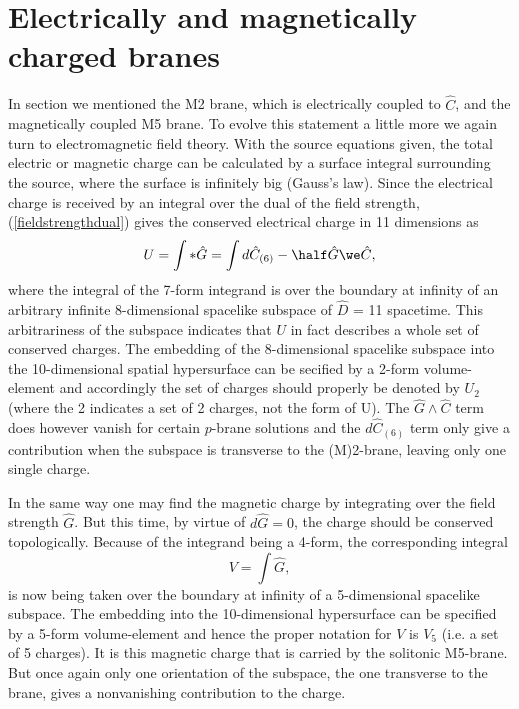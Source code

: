 \section{Electrically and magnetically charged branes}
In section  we mentioned the M2 brane, which is electrically coupled to $\hat C$, and the magnetically coupled M5 brane. 
To evolve this statement a little more we again turn to electromagnetic field theory. With the source equations given, the 
total electric or magnetic charge can be calculated by a surface integral surrounding the source, where the surface is infinitely big (Gauss's law).
Since the electrical charge is received by an integral over the dual of the field strength, (\ref{fieldstrengthdual}) 
gives the conserved electrical charge in 11 dimensions as
\begin{equation}
U=\int *\hat G = \int d\hat C_{(6)} - \half\hat G\we\hat C,
\end{equation}
where the integral of the 7-form integrand is over the boundary at infinity of an arbitrary infinite 8-dimensional 
spacelike subspace of $\hat D$ = 11 spacetime. This arbitrariness of the subspace indicates that $U$ in fact describes a 
whole set of conserved charges. The embedding of the 8-dimensional spacelike subspace into the 10-dimensional spatial 
hypersurface can be secified by a 2-form volume-element and accordingly the set of charges should properly be denoted by $U_{2}$ (where the 2 indicates a set of 2 charges, not the form of U).
The $\hat G \wedge \hat C$ term does however vanish for certain $p$-brane solutions and the $d\hat C_{(6)}$ term only give 
a contribution when the subspace is transverse to the (M)2-brane, leaving only one single charge\cite{supergrav_pbranes_lectures}.

In the same way one may find the magnetic charge by integrating over the field strength $\hat G$. But this time, by virtue of $d\hat G =0$, 
the charge should be conserved topologically. Because of the integrand being a 4-form, the corresponding integral
\begin{equation}
V=\int \hat G,
\end{equation}
is now being taken over the boundary at infinity of a 5-dimensional spacelike subspace. The embedding into the 10-dimensional 
hypersurface can be specified by a 5-form volume-element and hence the proper notation for $V$ is $V_{5}$ (i.e. a set of 5 charges). It is this 
magnetic charge that is carried by the solitonic M5-brane. But once again only one orientation of the subspace, the one transverse 
to the brane, gives a nonvanishing contribution to the charge.

